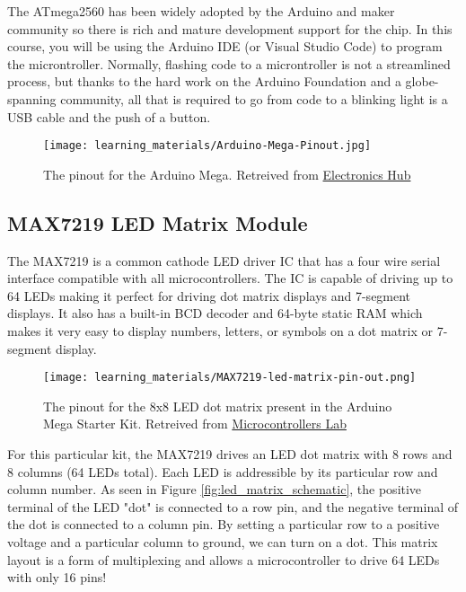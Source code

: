     The ATmega2560 has been widely adopted by the Arduino and maker community so there is rich and mature development support for the chip.
    In this course, you will be using the Arduino IDE (or Visual Studio Code) to program the microntroller. 
    Normally, flashing code to a microntroller is not a streamlined process, but thanks to the hard work on the Arduino Foundation and a globe-spanning community, all that is required to go from code to a blinking light is a USB cable and the push of a button.

    \begin{figure*}[h!]
        \texttt{[image: learning\_materials/Arduino-Mega-Pinout.jpg]}
        \caption[Arduino Mega Pinout]{The pinout for the Arduino Mega. Retreived from \href{https://www.electronicshub.org/wp-content/uploads/2021/01/Arduino-Mega-Pinout.jpg}{Electronics Hub}}
    \end{figure*}

    \subsection*{MAX7219 LED Matrix Module}
    The MAX7219 is a common cathode LED driver IC that has a four wire serial interface compatible with all microcontrollers.
    The IC is capable of driving up to 64 LEDs making it perfect for driving dot matrix displays and 7-segment displays.
    It also has a built-in BCD decoder and 64-byte static RAM which makes it very easy to display numbers, letters, or symbols on a dot matrix or 7-segment display.

    \begin{figure}[h!]
        \texttt{[image: learning\_materials/MAX7219-led-matrix-pin-out.png]}
        \caption[LED Matrix Pinout]{The pinout for the 8x8 LED dot matrix present in the Arduino Mega Starter Kit. 
        Retreived from \href{https://microcontrollerslab.com/wp-content/uploads/2021/09/MAX7219-led-matrix-pin-out.jpg?ezimgfmt=ng:webp/ngcb1}{Microcontrollers Lab}}
    \end{figure}


    For this particular kit, the MAX7219 drives an LED dot matrix with 8 rows and 8 columns (64 LEDs total). 
    Each LED is addressible by its particular row and column number.
    As seen in Figure \ref{fig:led_matrix_schematic}, the positive terminal of the LED "dot" is connected to a row pin, and the negative terminal of the dot is connected to a column pin.
    By setting a particular row to a positive voltage and a particular column to ground, we can turn on a dot.
    This matrix layout is a form of multiplexing and allows a microcontroller to drive 64 LEDs with only 16 pins!

